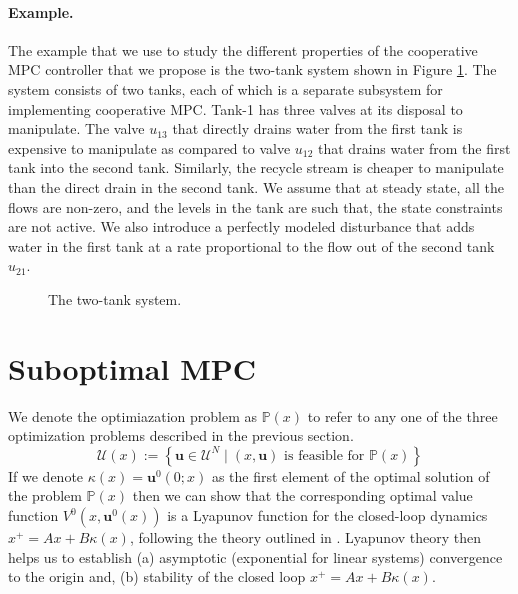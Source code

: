 \documentclass[10pt, twocolumn]{article}
\newcommand{\bu}{\mathbf{u}}
\newcommand{\set}[1]{\left\lbrace #1 \right\rbrace}
\theoremstyle{definition}
\begin{document}
\paragraph{\textbf{Example.}} The example that we use to study the
different properties of the cooperative MPC controller that we propose
is the two-tank system shown in Figure \ref{fig:2tank}. The system
consists of two tanks, each of which is a separate subsystem for
implementing cooperative MPC. Tank-1 has three valves at its disposal
to manipulate. The valve $u_{13}$ that directly drains water from the
first tank is expensive to manipulate as compared to valve $u_{12}$
that drains water from the first tank into the second tank. Similarly,
the recycle stream is cheaper to manipulate than the direct drain in
the second tank. We assume that at steady state, all the flows are
non-zero, and the levels in the tank are such that, the state
constraints are not active. %
We also introduce a perfectly modeled disturbance that adds water in the first tank at a rate proportional to the flow out of the second tank $u_{21}$. 
\begin{figure}
\centering
{\resizebox{0.9\columnwidth}{!}{}}
\caption{The two-tank system.}
\label{fig:2tank}
\end{figure}
\section{Suboptimal MPC}
We denote the optimiazation problem as $\mathbb{P}(x)$ to refer to any
one of the three optimization problems described in the previous
section.
\[ \mathcal{U}(x) := \set{ \bu \in \mathcal{U}^N \mid (x,\bu) \text{~is feasible for~} \mathbb{P}(x)}
\] 
If we denote $\kappa(x) = \bu^0(0;x)$ as the first element of the optimal solution of the problem $\mathbb{P}(x)$ then we can show that the corresponding optimal value function $V^0(x,\bu^0(x))$ is a  Lyapunov function for the closed-loop dynamics $x^+ = Ax +B\kappa(x)$, following the theory outlined in \citep[Chapter 2]{rawlings:mayne:2009}. Lyapunov theory then helps us to establish (a) asymptotic (exponential for linear systems) convergence to the origin and, (b) stability of the closed loop $x^+= Ax+B\kappa(x)$. 
\end{document}
